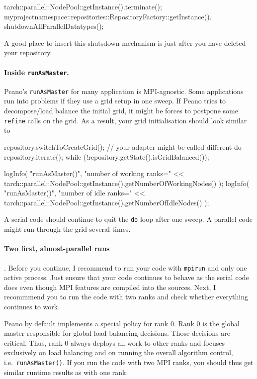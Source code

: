 \begin{code}
tarch::parallel::NodePool::getInstance().terminate();
myprojectnamespace::repositories::RepositoryFactory::getInstance().
  shutdownAllParallelDatatypes();
\end{code}

\noindent
A good place to insert this shutsdown mechanism is just after you have deleted
your repository.


\paragraph{Inside \texttt{runAsMaster}.}
Peano's \texttt{runAsMaster} for many application is MPI-agnostic.
Some applications run into problems if they use a grid setup in one sweep.
If Peano tries to decompose/load balance the initial grid, it might be forces to
postpone some \texttt{refine} calls on the grid. 
As a result, your grid initialisation should look similar to
\begin{code}
repository.switchToCreateGrid(); // your adapter might be called different
do {
  repository.iterate();
} while (!repository.getState().isGridBalanced());

logInfo(
  "runAsMaster()",
  "number of working ranks=" << 
  tarch::parallel::NodePool::getInstance().getNumberOfWorkingNodes() 
);
logInfo(
  "runAsMaster()",
  "number of idle ranks=" << tarch::parallel::NodePool::getInstance().getNumberOfIdleNodes()
);
\end{code}

\noindent
A serial code should continue to quit the \texttt{do} loop after one sweep. 
A parallel code might run through the grid several times.


\paragraph{Two first, almost-parallel runs}.
Before you continue, I recommend to run your code with \texttt{mpirun} and only
one active process. 
Just ensure that your code continues to behave as the serial code does even
though MPI features are compiled into the sources.
Next, I recommmend you to run the code with two ranks and check whether
everything continues to work.

\begin{remark}
Peano by default implements a special policy for rank 0. Rank 0 is the global
master responsible for global load balancing decisions. Those decisions are
critical. 
Thus, rank 0 always deploys all work to other ranks and focuses exclusively on
load balancing and on running the overall algorithm control,
i.e.~\texttt{runAsMaster()}.
If you run the code with two MPI ranks, you should thus get similar runtime
results as with one rank.
\end{remark}
 
